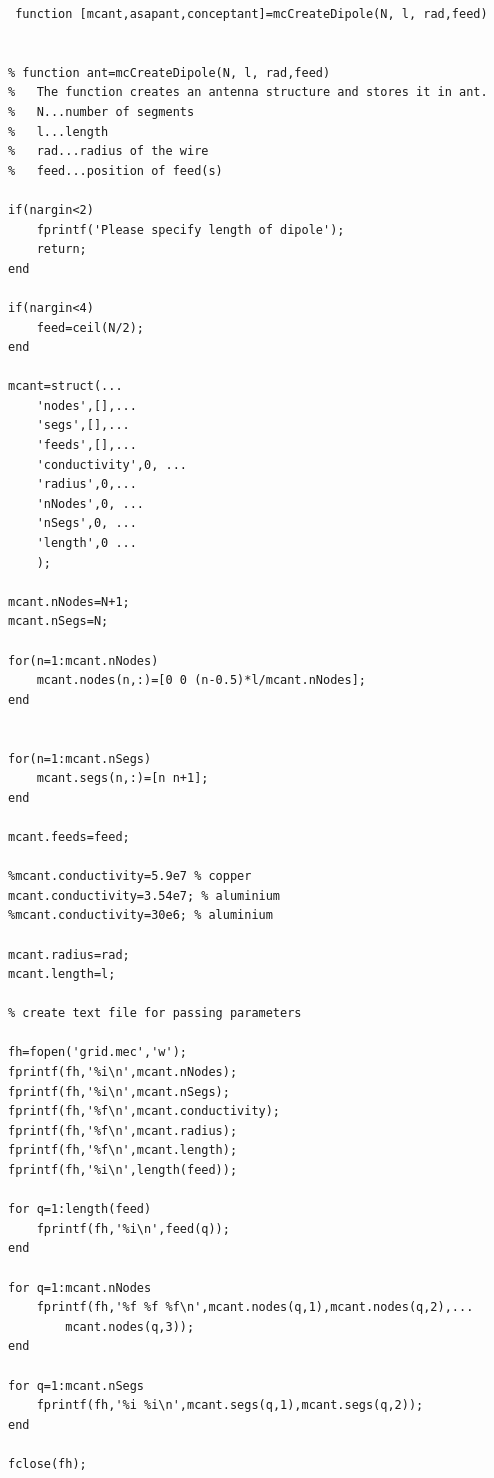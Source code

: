 \documentclass[a4paper,11pt]{thesis}
\begin{document}
\small
\begin{verbatim}
 function [mcant,asapant,conceptant]=mcCreateDipole(N, l, rad,feed)


% function ant=mcCreateDipole(N, l, rad,feed)
%   The function creates an antenna structure and stores it in ant.
%   N...number of segments
%   l...length
%   rad...radius of the wire
%   feed...position of feed(s)

if(nargin<2)
    fprintf('Please specify length of dipole');
    return;
end

if(nargin<4)
    feed=ceil(N/2);
end

mcant=struct(...
    'nodes',[],...
    'segs',[],...
    'feeds',[],...
    'conductivity',0, ...
    'radius',0,...
    'nNodes',0, ...
    'nSegs',0, ...
    'length',0 ...
    );

mcant.nNodes=N+1;
mcant.nSegs=N;

for(n=1:mcant.nNodes)
    mcant.nodes(n,:)=[0 0 (n-0.5)*l/mcant.nNodes];
end


for(n=1:mcant.nSegs)
    mcant.segs(n,:)=[n n+1];
end

mcant.feeds=feed;

%mcant.conductivity=5.9e7 % copper
mcant.conductivity=3.54e7; % aluminium
%mcant.conductivity=30e6; % aluminium

mcant.radius=rad;
mcant.length=l;

% create text file for passing parameters

fh=fopen('grid.mec','w');
fprintf(fh,'%i\n',mcant.nNodes);
fprintf(fh,'%i\n',mcant.nSegs);
fprintf(fh,'%f\n',mcant.conductivity);
fprintf(fh,'%f\n',mcant.radius);
fprintf(fh,'%f\n',mcant.length);
fprintf(fh,'%i\n',length(feed));

for q=1:length(feed)
    fprintf(fh,'%i\n',feed(q));
end

for q=1:mcant.nNodes
    fprintf(fh,'%f %f %f\n',mcant.nodes(q,1),mcant.nodes(q,2),...
    	mcant.nodes(q,3));
end

for q=1:mcant.nSegs
    fprintf(fh,'%i %i\n',mcant.segs(q,1),mcant.segs(q,2));
end

fclose(fh);
\end{verbatim}
\normalsize
\end{document}
